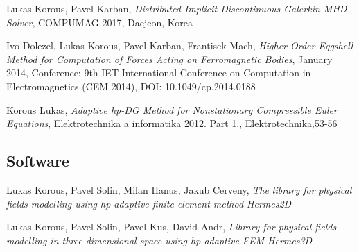 \begin{enumerate}[label={[\arabic*]}]
\item 
Lukas Korous, Pavel Karban, \textit{Distributed Implicit Discontinuous Galerkin MHD Solver}, COMPUMAG 2017, Daejeon, Korea
	
\item
Ivo Dolezel, Lukas Korous, Pavel Karban, Frantisek Mach, \textit{Higher-Order Eggshell Method for Computation of Forces Acting on Ferromagnetic Bodies}, January 2014, Conference: 9th IET International Conference on Computation in Electromagnetics (CEM 2014), DOI: 10.1049/cp.2014.0188

\item
Korous Lukas, \textit{Adaptive hp-DG Method for Nonstationary Compressible Euler Equations}, Elektrotechnika a informatika 2012. Part 1., Elektrotechnika,53-56
\end{enumerate}

\subsection*{Software}

\begin{enumerate}[label={[\arabic*]}]
\item
Lukas Korous, Pavel Solin, Milan Hanus, Jakub Cerveny, \textit{The library for physical fields modelling using hp-adaptive finite element method Hermes2D}

\item
Lukas Korous, Pavel Solin, Pavel Kus, David Andr, \textit{Library for physical fields modelling in three dimensional space using hp-adaptive FEM Hermes3D}
\end{enumerate}